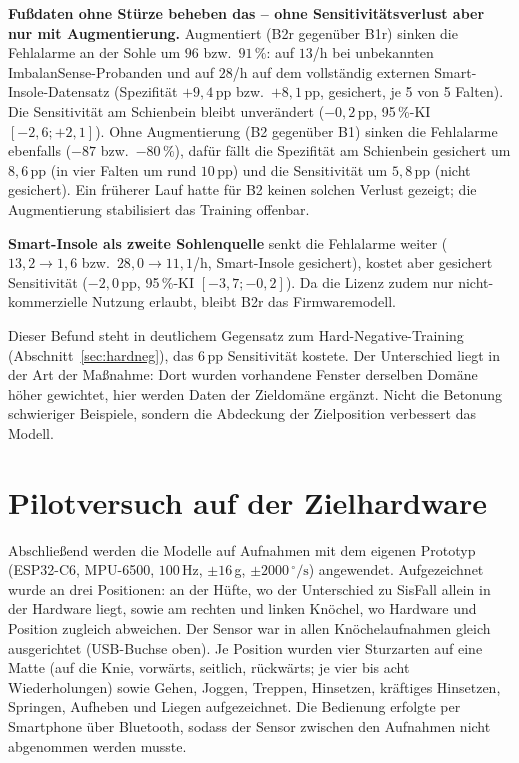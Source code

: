 \documentclass[11pt,a4paper,oneside]{report}
\begin{document}
\textbf{Fußdaten ohne Stürze beheben das -- ohne Sensitivitätsverlust
aber nur mit Augmentierung.} Augmentiert (B2r gegenüber B1r) sinken die
Fehlalarme an der Sohle um $96$ bzw.\ $91\,\%$: auf $13$/h bei
unbekannten ImbalanSense-Probanden und auf $28$/h auf dem vollständig
externen Smart-Insole-Datensatz (Spezifität $+9{,}4$\,pp bzw.\
$+8{,}1$\,pp, gesichert, je 5 von 5 Falten). Die Sensitivität am
Schienbein bleibt unverändert ($-0{,}2$\,pp, 95\,\%-KI
$[-2{,}6; +2{,}1]$). Ohne Augmentierung (B2 gegenüber B1) sinken die
Fehlalarme ebenfalls ($-87$ bzw.\ $-80\,\%$), dafür fällt die
Spezifität am Schienbein gesichert um $8{,}6$\,pp (in vier Falten um
rund $10$\,pp) und die Sensitivität um $5{,}8$\,pp (nicht gesichert).
Ein früherer Lauf hatte für B2 keinen solchen Verlust gezeigt; die
Augmentierung stabilisiert das Training offenbar.

\textbf{Smart-Insole als zweite Sohlenquelle} senkt die Fehlalarme
weiter ($13{,}2 \rightarrow 1{,}6$ bzw.\ $28{,}0 \rightarrow 11{,}1$/h,
Smart-Insole gesichert), kostet aber gesichert Sensitivität
($-2{,}0$\,pp, 95\,\%-KI $[-3{,}7; -0{,}2]$). Da die Lizenz zudem
nur nicht-kommerzielle Nutzung erlaubt, bleibt B2r das Firmwaremodell.

Dieser Befund steht in deutlichem Gegensatz zum Hard-Negative-Training
(Abschnitt~\ref{sec:hardneg}), das $6$\,pp Sensitivität kostete. Der
Unterschied liegt in der Art der Maßnahme: Dort wurden vorhandene
Fenster derselben Domäne höher gewichtet, hier werden Daten der
Zieldomäne ergänzt. Nicht die Betonung schwieriger Beispiele, sondern
die Abdeckung der Zielposition verbessert das Modell.

\section{Pilotversuch auf der Zielhardware}
\label{sec:fuss_pilot}

Abschließend werden die Modelle auf Aufnahmen mit dem eigenen
Prototyp (ESP32-C6, MPU-6500, $100$\,Hz, $\pm 16$\,g,
$\pm 2000\,^{\circ}/\mathrm{s}$) angewendet. Aufgezeichnet wurde an
drei Positionen: an der Hüfte, wo der Unterschied zu SisFall allein in
der Hardware liegt, sowie am rechten und linken Knöchel, wo Hardware
und Position zugleich abweichen. Der Sensor war in allen
Knöchelaufnahmen gleich ausgerichtet (USB-Buchse oben). Je Position
wurden vier Sturzarten auf eine Matte (auf die Knie, vorwärts,
seitlich, rückwärts; je vier bis acht Wiederholungen) sowie Gehen,
Joggen, Treppen, Hinsetzen, kräftiges Hinsetzen, Springen, Aufheben
und Liegen aufgezeichnet. Die Bedienung erfolgte per Smartphone über
Bluetooth, sodass der Sensor zwischen den Aufnahmen nicht abgenommen
werden musste.
\end{document}
